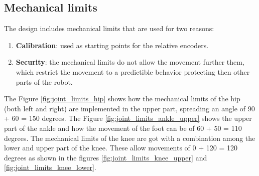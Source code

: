 \subsection{Mechanical limits} %
\label{sub:mechanical_limits}
The design includes mechanical limits that are used for two reasons:
\begin{enumerate}
  \item \textbf{Calibration}: used as starting points for the relative encoders.
  \item \textbf{Security}: the mechanical limits do not allow the movement further them, which restrict the movement to a predictible behavior protecting then other parts of the robot.
\end{enumerate}

The Figure \ref{fig:joint_limits_hip} shows how the mechanical limits of the hip (both left and right) are implemented in the upper part, spreading an angle of 90 + 60 = 150 degrees.
The Figure \ref{fig:joint_limits_ankle_upper} shows the upper part of the ankle and how the movement of the foot can be of 60 + 50 = 110 degrees.
The mechanical limits of the knee are got with a combination among the lower and upper part of the knee.
These allow movements of 0 + 120 = 120 degrees as shown in the figures \ref{fig:joint_limits_knee_upper} and \ref{fig:joint_limits_knee_lower}.

